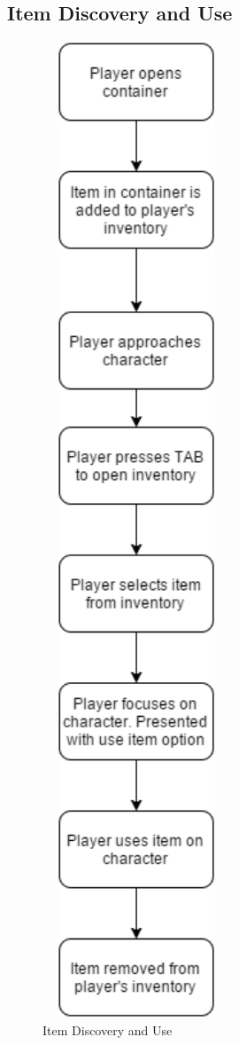 \subsection{Item Discovery and Use}
\begin{figure}[H]
\centering\includegraphics[width=0.5\textwidth, height=0.8\paperheight, keepaspectratio=true]{images/ItemUse}
  \caption{Item Discovery and Use}
  \label{fig:flow_item}
\end{figure}

